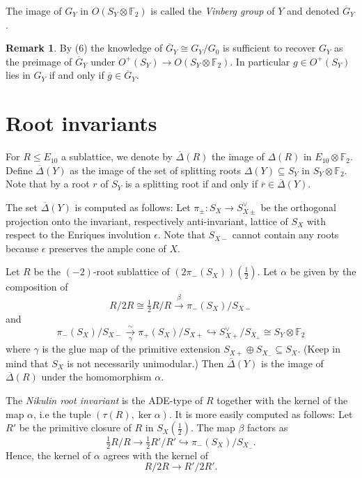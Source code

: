 \documentclass[a4paper]{amsart}
\theoremstyle{definition}
\newtheorem{remark}[definition]{Remark}
\theoremstyle{plain}
\newcommand{\FF}{\mathbb{F}}
\newcommand{\Gbar}{\overline{G}}
\newcommand{\DeltabarY}{\overline{\Delta}(Y)}
\begin{document}
\noindent The image of $G_Y$ in $O(S_Y\otimes \FF_2)$ is called the \emph{Vinberg group} of $Y$ and denoted $\Gbar_Y$.  
\begin{remark}\label{remark:GbarY}
By (6) the knowledge of $\Gbar_Y\cong G_Y/G_0$ is sufficient to recover $G_Y$ as the preimage of $\Gbar_Y$ under $O^+(S_Y)\to O(S_Y \otimes \FF_2)$.
In particular $g \in O^+(S_Y)$ lies in $G_Y$ if and only if $\overline{g} \in \Gbar_Y$.
\end{remark}

\section{Root invariants}\label{sec:root_invariants}
For $R \leq E_{10}$ a sublattice, we denote by $\overline{\Delta}(R)$ the image of $\Delta(R)$ in $E_{10}\otimes \FF_2$. Define $\DeltabarY$ as the image of the set of splitting roots $\Delta(Y) \subseteq S_Y$ in $S_Y \otimes \FF_2$. Note that by  a root $r$ of $S_Y$ is a splitting root if and only if $\overline{r} \in \DeltabarY$.

The set $\DeltabarY$ is computed as follows:
Let $\pi_{\pm}\colon S_X \to S_{X\pm}^\vee$ be the orthogonal projection onto the invariant, respectively anti-invariant, lattice of $S_X$ with respect to the Enriques involution $\epsilon$. Note that $S_{X-}$ cannot contain any roots because $\epsilon$ preserves the ample cone of $X$.

Let $R$ be the $(-2)$-root sublattice of $(2\pi_-(S_X))(\frac{1}{2})$. Let $\alpha$ be given by the composition of
\begin{equation}\label{eq:alpha1}
R/2R \cong \tfrac{1}{2}R/R \xrightarrow{\beta} \pi_-(S_X)/S_{X-}
\end{equation}
and
\begin{equation}\label{eq:alpha2}
    \pi_-(S_X)/S_{X-} \xrightarrow[\gamma]{\sim} \pi_+(S_X)/S_{X+} \hookrightarrow S_{X+}^\vee/S_{X_+}\cong S_Y\otimes \FF_2
\end{equation}
where $\gamma$ is the glue map of the primitive extension $S_{X+}\oplus S_{X_-} \subseteq S_X$. (Keep in mind that $S_X$ is not necessarily unimodular.)
Then $\DeltabarY$ is the image of $\overline{\Delta}(R)$ under the homomorphism $\alpha$. 

The \emph{Nikulin root invariant} is the ADE-type of $R$ together with the kernel of the map $\alpha$, i.e the tuple $(\tau(R),\ker \alpha)$. It is more easily computed as follows:
Let $R'$ be the primitive closure of $R$ in $S_X(\frac{1}{2})$. The map $\beta$ factors as
\[\tfrac{1}{2}R/R \to \tfrac{1}{2}R'/R' \hookrightarrow \pi_-(S_X)/S_{X_-}.\]
Hence, the kernel of $\alpha$ agrees with the kernel of
\[R/2R \to R'/2R'.\]
\end{document}
